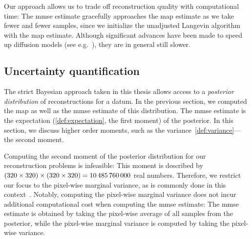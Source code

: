 Our approach allows us to trade off reconstruction quality with computational time:
The \gls{mmse} estimate gracefully approaches the \gls{map} estimate as we take fewer and fewer samples, since we initialize the unadjusted Langevin algorithm with the \gls{map} estimate.
Although significant advances have been made to speed up diffusion models (see e.g.~\cite{Karras2022edm,chung2022come}), they are in general still slower.
\subsection{Uncertainty quantification}
The strict Bayesian approach taken in this thesis allows access to a \emph{posterior distribution} of reconstructions for a datum.
In the previous section, we computed the \gls{map} as well as the \gls{mmse} estimate of this distribution.
The \gls{mmse} estimate is the expectation (\cref{def:expectation}, the first moment) of the posterior.
In this section, we discuss higher order moments, such as the variance~\cref{def:variance}---the second moment.

Computing the second moment of the posterior distribution for our reconstruction problems is infeasible:
This moment is described by \( (\numproduct{320x320})\times(\numproduct{320x320}) = \num{10485760000} \) real numbers.
Therefore, we restrict our focus to the pixel-wise marginal variance, as is commonly done in this context~\cite{chung_scoremri_2022,Narnhofer2024,Pereyra2023}.
Notably, computing the pixel-wise marginal variance does not incur additional computational cost when computing the \gls{mmse} estimate:
The \gls{mmse} estimate is obtained by taking the pixel-wise average of all samples from the posterior, while the pixel-wise marginal variance is computed by taking the pixel-wise variance.

